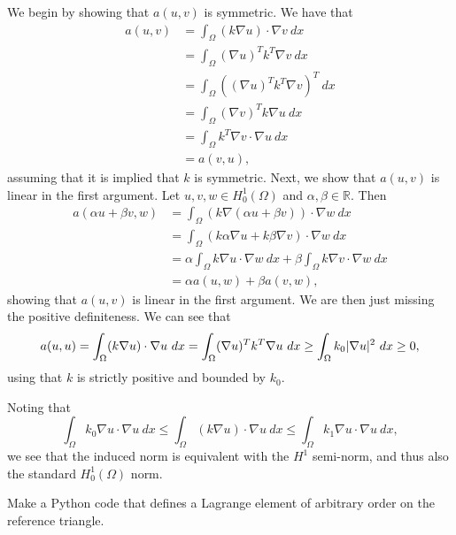 \begin{solution}
    We begin by showing that $a(u, v)$ is symmetric.
    We have that
    \begin{align*}
        a(u, v)
        &= \int_\Omega (k \nabla u) \cdot \nabla v \ dx \\
        &= \int_\Omega (\nabla u)^T k^T \nabla v \ dx \\
        &= \int_\Omega \left( (\nabla u)^T k^T \nabla v \right)^T \ dx \\
        &= \int_\Omega (\nabla v)^T k \nabla u \ dx \\
        &= \int_\Omega k^T \nabla v \cdot \nabla u \ dx \\
        &= a(v, u),
    \end{align*}
    assuming that it is implied that $k$ is symmetric.
    Next, we show that $a(u, v)$ is linear in the first argument.
    Let $u, v, w \in H^1_0(\Omega)$ and $\alpha, \beta \in \mathbb{R}$.
    Then
    \begin{align*}
        a(\alpha u + \beta v, w)
        &= \int_\Omega (k \nabla (\alpha u + \beta v)) \cdot \nabla w \ dx \\
        &= \int_\Omega (k \alpha \nabla u + k \beta \nabla v) \cdot \nabla w \ dx \\
        &= \alpha \int_\Omega k \nabla u \cdot \nabla w \ dx + \beta \int_\Omega k \nabla v \cdot \nabla w \ dx \\
        &= \alpha a(u, w) + \beta a(v, w),
    \end{align*}
    showing that $a(u, v)$ is linear in the first argument.
    We are then just missing the positive definiteness.
    We can see that
    \begin{equation*}
        a(u, u) = \int_\Omega (k \nabla u) \cdot \nabla u \ dx = \int_\Omega (\nabla u)^T k^T \nabla u \ dx \geq \int_\Omega k_0 \lvert\nabla u\rvert^2 \ dx \geq 0,
    \end{equation*}
    using that $k$ is strictly positive and bounded by $k_0$.

    Noting that
    \begin{equation*}
        \int_\Omega k_0 \nabla u \cdot \nabla u \ dx
        \leq \int_\Omega (k \nabla u) \cdot \nabla u \ dx
        \leq \int_\Omega k_1 \nabla u \cdot \nabla u \ dx,
    \end{equation*}
    we see that the induced norm is equivalent with the $H^1$ semi-norm, and thus also the standard $H^1_0(\Omega)$ norm.
\end{solution}

\begin{exercise}
    Make a Python code that defines a Lagrange element of arbitrary order on the reference triangle.
\end{exercise}